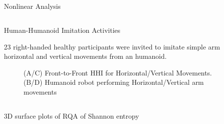 {{\begin{frame}{Nonlinear Analysis}
\end{frame}
}




\subsection{}
{

\begin{frame}{Human-Humanoid Imitation Activities}

\small
23 right-handed healthy participants were invited to imitate 
simple arm horizontal and vertical movements from an humanoid.
    \begin{figure}
	\caption[PA]{(A/C) Front-to-Front HHI  
		for Horizontal/Vertical Movements.
		(B/D) Humanoid robot performing Horizontal/Vertical arm movements
		}
   \end{figure}
	
\end{frame}
}




\subsection{}
{

\begin{frame}{3D surface plots of RQA of Shannon entropy}
    \begin{figure}
   \end{figure}
	
\end{frame}
}




\subsection{}
{

}}
